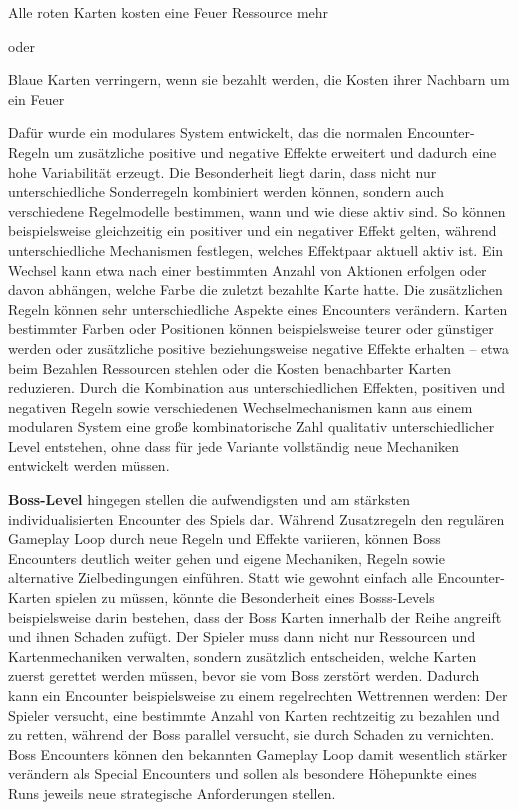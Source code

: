 \begin{center}
	\glqq Alle roten Karten kosten eine Feuer Ressource mehr\grqq
\end{center}
oder
\begin{center}
	\glqq Blaue Karten verringern, wenn sie bezahlt werden, die Kosten ihrer Nachbarn um ein Feuer\grqq
\end{center}
Dafür wurde ein modulares System entwickelt, das die normalen Encounter-Regeln um zusätzliche positive und negative Effekte erweitert und dadurch eine hohe Variabilität erzeugt.
Die Besonderheit liegt darin, dass nicht nur unterschiedliche Sonderregeln kombiniert werden können, sondern auch verschiedene Regelmodelle bestimmen, wann und wie diese aktiv sind.
So können beispielsweise gleichzeitig ein positiver und ein negativer Effekt gelten, während unterschiedliche Mechanismen festlegen, welches Effektpaar aktuell aktiv ist.
Ein Wechsel kann etwa nach einer bestimmten Anzahl von Aktionen erfolgen oder davon abhängen, welche Farbe die zuletzt bezahlte Karte hatte.
Die zusätzlichen Regeln können sehr unterschiedliche Aspekte eines Encounters verändern.
Karten bestimmter Farben oder Positionen können beispielsweise teurer oder günstiger werden oder zusätzliche positive beziehungsweise negative Effekte erhalten -- etwa beim Bezahlen Ressourcen stehlen oder die Kosten benachbarter Karten reduzieren.
Durch die Kombination aus unterschiedlichen Effekten, positiven und negativen Regeln sowie verschiedenen Wechselmechanismen kann aus einem modularen System eine große kombinatorische Zahl qualitativ unterschiedlicher Level entstehen, ohne dass für jede Variante vollständig neue Mechaniken entwickelt werden müssen.

\textbf{Boss-Level} hingegen stellen die aufwendigsten und am stärksten individualisierten Encounter des Spiels dar.
Während Zusatzregeln den regulären Gameplay Loop durch neue Regeln und Effekte variieren, können Boss Encounters deutlich weiter gehen und eigene Mechaniken, Regeln sowie alternative Zielbedingungen einführen.
Statt wie gewohnt einfach alle Encounter-Karten spielen zu müssen, könnte die Besonderheit eines Bosss-Levels beispielsweise darin bestehen, dass der Boss Karten innerhalb der Reihe angreift und ihnen Schaden zufügt.
Der Spieler muss dann nicht nur Ressourcen und Kartenmechaniken verwalten, sondern zusätzlich entscheiden, welche Karten zuerst gerettet werden müssen, bevor sie vom Boss zerstört werden.
Dadurch kann ein Encounter beispielsweise zu einem regelrechten Wettrennen werden: Der Spieler versucht, eine bestimmte Anzahl von Karten rechtzeitig zu bezahlen und zu retten, während der Boss parallel versucht, sie durch Schaden zu vernichten.
Boss Encounters können den bekannten Gameplay Loop damit wesentlich stärker verändern als Special Encounters und sollen als besondere Höhepunkte eines Runs jeweils neue strategische Anforderungen stellen.

